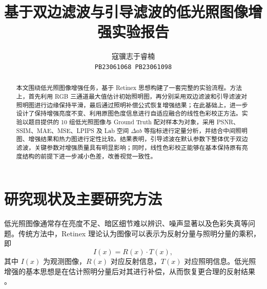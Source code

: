 \documentclass[10pt,twocolumn,letterpaper]{article}
\title{基于双边滤波与引导滤波的低光照图像增强实验报告}
\author{寇骥志\quad 于睿楠\\
{\tt\small PB23061068 \quad PB23061098}}
\begin{document}
\maketitle

\begin{abstract}
本文围绕低光照图像增强任务，基于 Retinex 思想构建了一套完整的实验流程。方法上，首先利用 RGB 三通道最大值估计初始照明图，再分别采用双边滤波和引导滤波对照明图进行边缘保持平滑，最后通过照明补偿公式恢复增强结果；在此基础上，进一步设计了保持增强亮度不变、利用原图色度信息进行自适应融合的线性色彩校正方法。实验以题目提供的 10 组低光照图像与 Ground Truth 配对样本为对象，采用 PSNR、SSIM、MAE、MSE、LPIPS 及 Lab 空间 $\Delta ab$ 等指标进行定量分析，并结合中间照明图、增强结果和热力图进行定性比较。结果表明，引导滤波在默认参数下整体优于双边滤波，关键参数对增强质量具有明显影响；同时，线性色彩校正能够在基本保持原有亮度结构的前提下进一步减小色差，改善视觉一致性。

\end{abstract}

\section{研究现状及主要研究方法}
低光照图像通常存在亮度不足、暗区细节难以辨识、噪声显著以及色彩失真等问题。传统方法中，Retinex 理论认为图像可以表示为反射分量与照明分量的乘积，即
\begin{equation}
I(x)=R(x)\cdot T(x),
\end{equation}
其中 $I(x)$ 为观测图像，$R(x)$ 对应反射信息，$T(x)$ 对应照明信息。低光照增强的基本思想是在估计照明分量后对其进行补偿，从而恢复更合理的反射结果 \cite{land1971retinex}。
\end{document}

